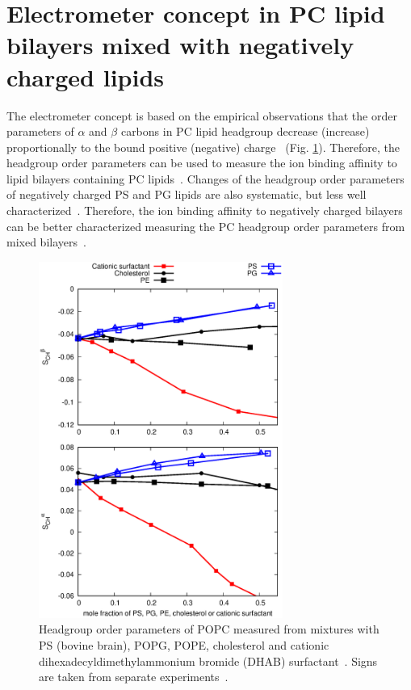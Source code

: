 \documentclass[journal=jpcbfk]{achemso}
\begin{document}
\section{Electrometer concept in PC lipid bilayers mixed with negatively charged lipids}\label{electrometerFORmixtures}

The electrometer concept is based on the empirical observations that
the order parameters of $\alpha$ and $\beta$ carbons in PC lipid headgroup
decrease (increase) proportionally to the bound positive (negative) 
charge~\cite{akutsu81,altenbach84,seelig87,scherer89} (Fig. \ref{HGorderparametersPCvsPEPSPGchol}). 
Therefore, the headgroup order parameters can be used to measure the
ion binding affinity to lipid bilayers containing PC
lipids~\cite{akutsu81,altenbach84,borle85,seelig87,macdonald87,roux90}.
Changes of the headgroup order parameters of negatively charged PS and PG lipids
are also systematic, but less well characterized~\cite{borle85,macdonald87,roux86,roux90}.
Therefore, the ion binding affinity to negatively charged bilayers
can be better characterized measuring the PC headgroup order parameters from 
mixed bilayers~\cite{borle85,roux86,macdonald87,roux90,roux91}.
\begin{figure}[]
  \centering
  \includegraphics[width=8.0cm]{../Figs/HGorderparametersPCvsPEPSPGchol.eps}
  \caption{\label{HGorderparametersPCvsPEPSPGchol}
    Headgroup order parameters of POPC measured from mixtures with
    PS (bovine brain), POPG, POPE, cholesterol and cationic dihexadecyldimethylammonium bromide (DHAB) surfactant~\cite{scherer87,scherer89,ferreira13}.
    Signs are taken from separate experiments~\cite{ollila16,ferreira16}.
  }
\end{figure}
\end{document}
